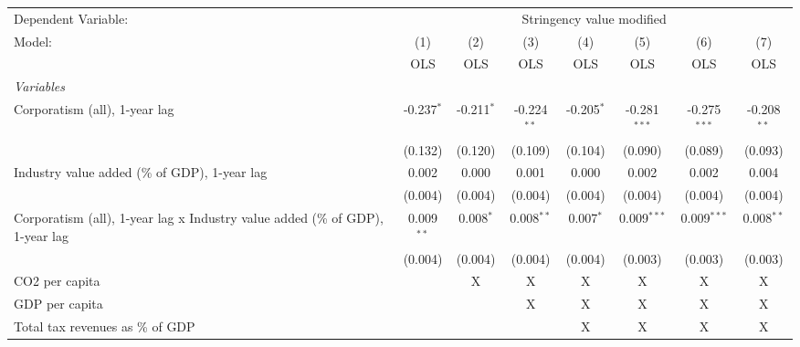 
\begingroup
\centering
\begin{tabular}{lccccccc}
   \toprule
   Dependent Variable: & \multicolumn{7}{c}{Stringency value modified}\\
   Model:                                                                        & (1)          & (2)          & (3)           & (4)          & (5)            & (6)            & (7)\\  
                                                                                 &  OLS         & OLS          & OLS           & OLS          & OLS            & OLS            & OLS\\  
   \midrule
   \emph{Variables}\\
   Corporatism (all), 1-year lag                                                 & -0.237$^{*}$ & -0.211$^{*}$ & -0.224$^{**}$ & -0.205$^{*}$ & -0.281$^{***}$ & -0.275$^{***}$ & -0.208$^{**}$\\   
                                                                                 & (0.132)      & (0.120)      & (0.109)       & (0.104)      & (0.090)        & (0.089)        & (0.093)\\   
   Industry value added (\% of GDP), 1-year lag                                  & 0.002        & 0.000        & 0.001         & 0.000        & 0.002          & 0.002          & 0.004\\   
                                                                                 & (0.004)      & (0.004)      & (0.004)       & (0.004)      & (0.004)        & (0.004)        & (0.004)\\   
   Corporatism (all), 1-year lag x Industry value added (\% of GDP), 1-year lag  & 0.009$^{**}$ & 0.008$^{*}$  & 0.008$^{**}$  & 0.007$^{*}$  & 0.009$^{***}$  & 0.009$^{***}$  & 0.008$^{**}$\\   
                                                                                 & (0.004)      & (0.004)      & (0.004)       & (0.004)      & (0.003)        & (0.003)        & (0.003)\\   
   CO2 per capita                                                                &              & X            & X             & X            & X              & X              & X\\  
   GDP per capita                                                                &              &              & X             & X            & X              & X              & X\\  
   Total tax revenues as \% of GDP                                               &              &              &               & X            & X              & X              & X\\  

\end{tabular}
